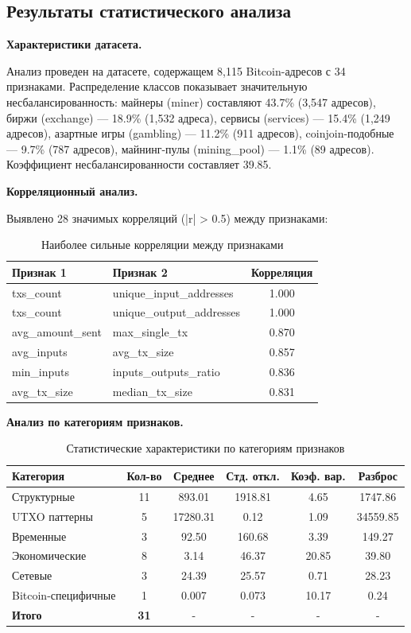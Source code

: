\subsection{Результаты статистического анализа}

\textbf{Характеристики датасета.}

Анализ проведен на датасете, содержащем 8,115 Bitcoin-адресов с 34 признаками. Распределение классов показывает значительную несбалансированность: майнеры (miner) составляют 43.7\% (3,547 адресов), биржи (exchange) — 18.9\% (1,532 адреса), сервисы (services) — 15.4\% (1,249 адресов), азартные игры (gambling) — 11.2\% (911 адресов), coinjoin-подобные — 9.7\% (787 адресов), майнинг-пулы (mining\_pool) — 1.1\% (89 адресов). Коэффициент несбалансированности составляет 39.85.

\textbf{Корреляционный анализ.}

Выявлено 28 значимых корреляций (|r| > 0.5) между признаками:

\begin{table}[H]
\centering
\caption{Наиболее сильные корреляции между признаками}
\label{tab:correlations}
\begin{tabular}{|l|l|c|}
\hline
\textbf{Признак 1} & \textbf{Признак 2} & \textbf{Корреляция} \\
\hline
txs\_count & unique\_input\_addresses & 1.000 \\
txs\_count & unique\_output\_addresses & 1.000 \\
avg\_amount\_sent & max\_single\_tx & 0.870 \\
avg\_inputs & avg\_tx\_size & 0.857 \\
min\_inputs & inputs\_outputs\_ratio & 0.836 \\
avg\_tx\_size & median\_tx\_size & 0.831 \\
\hline
\end{tabular}
\end{table}

\textbf{Анализ по категориям признаков.}

\begin{table}[H]
\centering
\caption{Статистические характеристики по категориям признаков}
\label{tab:feature_categories}
\begin{tabular}{|l|c|c|c|c|c|}
\hline
\textbf{Категория} & \textbf{Кол-во} & \textbf{Среднее} & \textbf{Стд. откл.} & \textbf{Коэф. вар.} & \textbf{Разброс} \\
\hline
Структурные & 11 & 893.01 & 1918.81 & 4.65 & 1747.86 \\
UTXO паттерны & 5 & 17280.31 & 0.12 & 1.09 & 34559.85 \\
Временные & 3 & 92.50 & 160.68 & 3.39 & 149.27 \\
Экономические & 8 & 3.14 & 46.37 & 20.85 & 39.80 \\
Сетевые & 3 & 24.39 & 25.57 & 0.71 & 28.23 \\
Bitcoin-специфичные & 1 & 0.007 & 0.073 & 10.17 & 0.24 \\
\hline
\textbf{Итого} & \textbf{31} & - & - & - & - \\
\hline
\end{tabular}
\end{table}

